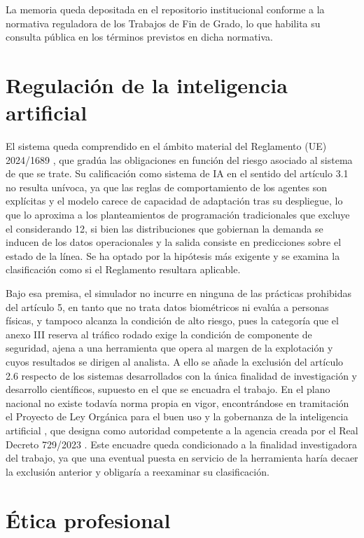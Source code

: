 La memoria queda depositada en el repositorio institucional conforme a la normativa
reguladora de los Trabajos de Fin de Grado, lo que habilita su consulta pública en los
términos previstos en dicha normativa.



\section{Regulación de la inteligencia artificial}

El sistema queda comprendido en el ámbito material del Reglamento (UE) 2024/1689
\cite{ria2024}, que gradúa las obligaciones en función del riesgo asociado al sistema de que
se trate. Su calificación como sistema de IA en el sentido del artículo 3.1 no resulta
unívoca, ya que las reglas de comportamiento de los agentes son explícitas y el modelo carece
de capacidad de adaptación tras su despliegue, lo que lo aproxima a los planteamientos de
programación tradicionales que excluye el considerando 12, si bien las distribuciones que
gobiernan la demanda se inducen de los datos operacionales y la salida consiste en
predicciones sobre el estado de la línea. Se ha optado por la hipótesis más exigente y se
examina la clasificación como si el Reglamento resultara aplicable.

Bajo esa premisa, el simulador no incurre en ninguna de las prácticas prohibidas del artículo
5, en tanto que no trata datos biométricos ni evalúa a personas físicas, y tampoco alcanza la
condición de alto riesgo, pues la categoría que el anexo III reserva al tráfico rodado exige
la condición de componente de seguridad, ajena a una herramienta que opera al margen de la
explotación y cuyos resultados se dirigen al analista. A ello se añade la exclusión del
artículo 2.6 respecto de los sistemas desarrollados con la única finalidad de investigación y
desarrollo científicos, supuesto en el que se encuadra el trabajo. En el plano nacional no
existe todavía norma propia en vigor, encontrándose en tramitación el Proyecto de Ley
Orgánica para el buen uso y la gobernanza de la inteligencia artificial
\cite{proyectoLOIA2026}, que designa como autoridad competente a la agencia creada por el
Real Decreto 729/2023 \cite{rd729_2023}. Este encuadre queda condicionado a la finalidad
investigadora del trabajo, ya que una eventual puesta en servicio de la herramienta haría
decaer la exclusión anterior y obligaría a reexaminar su clasificación.


\section{Ética profesional}


